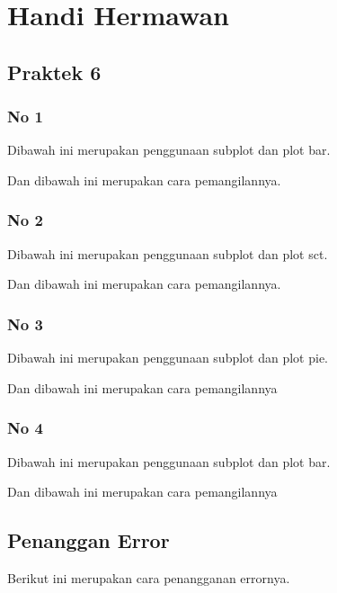 \section{Handi Hermawan}
\subsection{Praktek 6}
\subsubsection{No 1}
\hfill \break
Dibawah ini merupakan penggunaan subplot dan plot bar.

Dan dibawah ini merupakan cara pemangilannya.


\subsubsection{No 2}
\hfill \break
Dibawah ini merupakan penggunaan subplot dan plot sct.

Dan dibawah ini merupakan cara pemangilannya.


\subsubsection{No 3}
\hfill \break
Dibawah ini merupakan penggunaan subplot dan plot pie.

Dan dibawah ini merupakan cara pemangilannya


\subsubsection{No 4}
\hfill \break
Dibawah ini merupakan penggunaan subplot dan plot bar.

Dan dibawah ini merupakan cara pemangilannya


\subsection{Penanggan Error}
\hfill \break
Berikut ini merupakan cara penangganan errornya.




